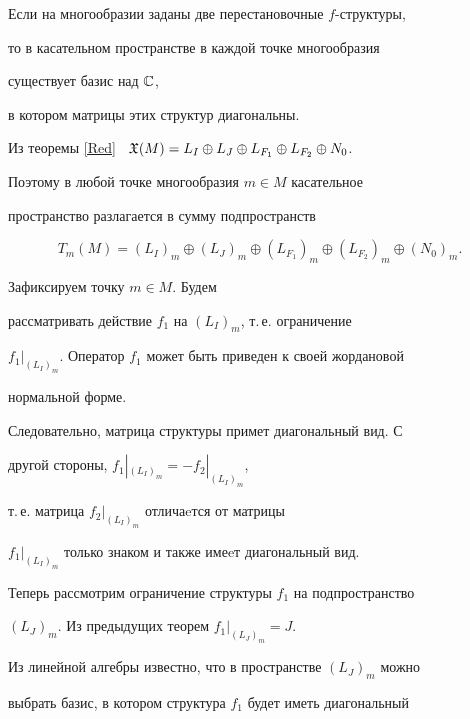 \begin{thm}


Если на многообразии заданы две перестановочные $f$-структуры,


то в касательном пространстве в каждой точке многообразия


существует базис над $\Bbb{C}$,


в котором матрицы этих структур диагональны.


\end{thm}





\begin{pf}


Из теоремы \ref{Red} \ $\frak{X}(M)=L_I\oplus L_J\oplus


L_{F_1}\oplus L_{F_2}\oplus N_0$.


Поэтому в любой точке многообразия $m\in M$ касательное


пространство разлагается в сумму подпространств


$$


T_m(M)=(L_I)_m\oplus (L_J)_m\oplus (L_{F_1})_m\oplus


(L_{F_2})_m\oplus (N_0)_m.


$$





Зафиксируем точку $m\in M$. Будем


рассматривать действие $f_1$ на $(L_I)_m$, т.\,е.  ограничение


$f_1|_{(L_I)_m}$. Оператор $f_1$ может быть приведен к своей жордановой


нормальной форме.


Следовательно, матрица структуры примет диагональный вид. С


другой стороны, $f_1|_{(L_I)_m}=-f_2|_{(L_I)_m}$,


т.\,е. матрица $f_2|_{(L_I)_m}$ отличаeтся от матрицы


$f_1|_{(L_I)_m}$ только знаком и также имеeт диагональный вид.





Теперь рассмотрим ограничение структуры $f_1$ на подпространство


$(L_J)_m$. Из предыдущих теорем $f_1|_{(L_J)_m}=J$.


Из линейной алгебры известно, что в пространстве $(L_J)_m$ можно


выбрать базис, в котором структура $f_1$ будет иметь диагональный



\end{pf}
